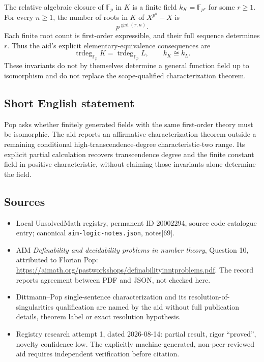 \documentclass[11pt]{article}
\newcommand{\F}{\mathbb{F}}
\begin{document}
The relative algebraic closure of $\F_p$ in $K$ is a finite field $k_K=\F_{p^r}$ for some $r\ge1$. For every $n\ge1$, the number of roots in $K$ of $X^{p^n}-X$ is
\[
 p^{\gcd(r,n)}.
\]
Each finite root count is first-order expressible, and their full sequence determines $r$. Thus the aid's explicit elementary-equivalence consequences are
\[
 \operatorname{trdeg}_{\F_p}K=\operatorname{trdeg}_{\F_p}L,
 \qquad k_K\cong k_L.
\]
These invariants do not by themselves determine a general function field up to isomorphism and do not replace the scope-qualified characterization theorem.
\subsection{Short English statement}
Pop asks whether finitely generated fields with the same first-order theory must be isomorphic. The aid reports an affirmative characterization theorem outside a remaining conditional high-transcendence-degree characteristic-two range. Its explicit partial calculation recovers transcendence degree and the finite constant field in positive characteristic, without claiming those invariants alone determine the field.
\subsection{Sources}
\begin{itemize}
\item Local UnsolvedMath registry, permanent ID 20002294, source code catalogue entry; canonical \texttt{aim-logic-notes.json}, notes[69].
\item AIM \emph{Definability and decidability problems in number theory}, Question 10, attributed to Florian Pop: \url{https://aimath.org/pastworkshops/definabilityinntproblems.pdf}. The record reports agreement between PDF and JSON, not checked here.
\item Dittmann--Pop single-sentence characterization and its resolution-of-singularities qualification are named by the aid without full publication details, theorem label or exact resolution hypothesis.
\item Registry research attempt 1, dated 2026-08-14: partial result, rigor ``proved'', novelty confidence low. The explicitly machine-generated, non-peer-reviewed aid requires independent verification before citation.
\end{itemize}
\end{document}
